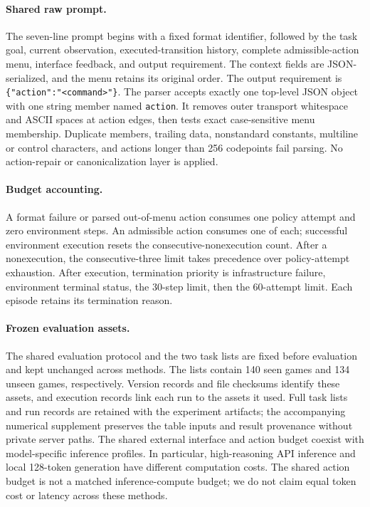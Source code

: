 \paragraph{Shared raw prompt.}
The seven-line prompt begins with a fixed format identifier, followed by
the task goal, current observation, executed-transition history, complete
admissible-action menu, interface feedback, and output requirement. The
context fields are JSON-serialized, and the menu retains its original order.
The output requirement is \texttt{\{"action":"<command>"\}}.
The parser accepts exactly one top-level JSON object with one string member
named \texttt{action}. It removes outer transport whitespace and ASCII
spaces at action edges, then tests exact case-sensitive menu membership.
Duplicate members, trailing data, nonstandard constants, multiline or control
characters, and actions longer than 256 codepoints fail parsing.
No action-repair or canonicalization layer is applied.

\paragraph{Budget accounting.}
A format failure or parsed out-of-menu action consumes one policy attempt
and zero environment steps. An admissible action consumes one of each;
successful environment execution resets the consecutive-nonexecution count.
After a nonexecution, the consecutive-three limit takes precedence over
policy-attempt exhaustion. After execution, termination priority is
infrastructure failure, environment terminal status, the 30-step limit,
then the 60-attempt limit. Each episode retains its termination reason.

\paragraph{Frozen evaluation assets.}
The shared evaluation protocol and the two task lists are fixed before
evaluation and kept unchanged across methods. The lists contain 140 seen
games and 134 unseen games, respectively. Version records and file checksums
identify these assets, and execution records link each run to the assets it
used. Full task lists and run records are retained with the experiment
artifacts; the accompanying numerical supplement preserves the table inputs and
result provenance without private server paths.
The shared external interface and action budget coexist with model-specific
inference profiles. In particular, high-reasoning API inference and local
128-token generation have different computation costs. The shared action budget is not a matched inference-compute budget;
we do not claim equal token cost or latency across these methods.

